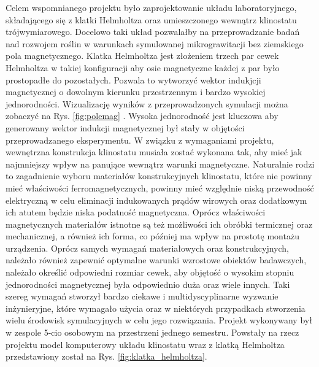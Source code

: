 Celem wspomnianego projektu było zaprojektowanie układu laboratoryjnego, składającego się z
 klatki Helmholtza oraz umieszczonego wewnątrz klinostatu trójwymiarowego. Docelowo taki układ
  pozwalałby na przeprowadzanie badań nad rozwojem roślin w warunkach symulowanej
   mikrograwitacji bez ziemskiego pola magnetycznego. Klatka Helmholtza jest złożeniem trzech
    par cewek Helmholtza w takiej konfiguracji aby osie magnetyczne każdej z par było
     prostopadłe do pozostałych. Pozwala to wytworzyć wektor indukjcji magnetycznej o dowolnym
      kierunku przestrzennym i bardzo wysokiej jednorodności. Wizualizację wyników z przeprowadzonych symulacji można zobaczyć na Rys. \ref{fig:polemag} . Wysoka jednorodność jest kluczowa
       aby generowany wektor indukcji magnetycznej był stały w objętości przeprowadzanego
        eksperymentu. W związku z wymaganiami projektu, wewnętrzna konstrukcja klinostatu
         musiała zostać wykonana tak, aby mieć jak najmniejszy wpływ na panujące wewnątrz
          warunki magnetyczne. Naturalnie rodzi to zagadnienie wyboru materiałów konstrukcyjnych
           klinostatu, które nie powinny mieć właściwości ferromagnetycznych, powinny mieć
            względnie niską przewodność elektryczną w celu eliminacji indukowanych prądów
             wirowych oraz dodatkowym ich atutem będzie niska podatność magnetyczna. Oprócz
              właściwości magnetycznych materiałów istnotne są też możliwości ich obróbki
               termicznej oraz mechanicznej, a również ich forma, co później ma wpływ na
                prostotę montażu urządzenia. Oprócz samych wymagań materiałowych oraz
                 konstrukcyjnych, należało również zapewnić optymalne warunki wzrostowe obiektów
                  badawczych, należało określić odpowiedni rozmiar cewek, aby objętość o wysokim
                   stopniu jednorodności magnetycznej była odpowiednio duża oraz wiele innych.
                    Taki szereg wymagań stworzył bardzo ciekawe i multidyscyplinarne wyzwanie
                     inżynieryjne, które wymagało użycia oraz w niektórych przypadkach
                      stworzenia wielu środowisk symulacyjnych w celu jego rozwiązania. Projekt
                       wykonywany był w zespole 5-cio osobowym na przestrzeni jednego semestru.
                        Powstały na rzecz projektu model komputerowy układu klinostatu wraz z
                         klatką Helmholtza przedstawiony został na Rys.
                          \ref{fig:klatka_helmholtza}.
                          
